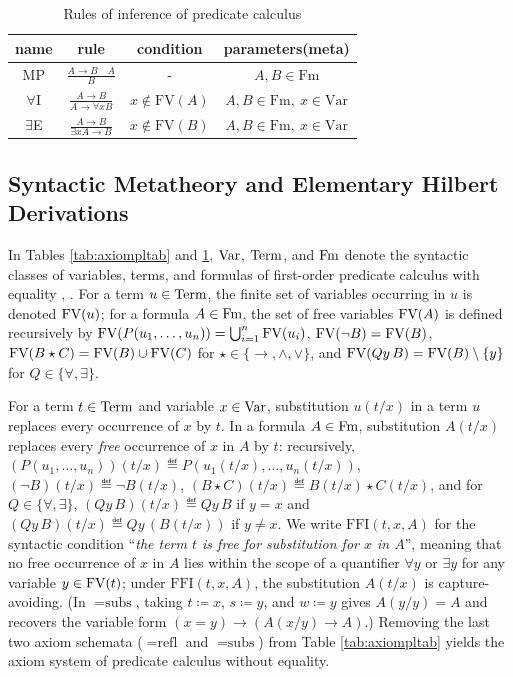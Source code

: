 \documentclass[10pt,a4paper]{article}
\begin{document}
\begin{table}[H]
\centering
\caption{Rules of inference of predicate calculus}
\label{tab:rulestab}
\begin{tabular}{|c|c|c|c|}
\hline
name & rule & condition & parameters(meta) \\ \hline
\hline
MP & \rule[-2.5ex]{0pt}{7ex} $\frac{A\to B\quad A}{B}$ & - & $A,B \in \textrm{Fm}$ \\ \hline
\hline
\rule[-2.5ex]{0pt}{7ex}
$\forall$I & $\frac{A\to B}{A\to \forall x B}$ & $x \notin \textrm{FV}(A)$ & $A,B \in \textrm{Fm},\ x \in \textrm{Var}$ \\ \hline
\hline
\rule[-2.5ex]{0pt}{7ex}
$\exists$E & $\frac{A\to B}{\exists x A\to B}$ & $x \notin \textrm{FV}(B)$ & $A,B \in \textrm{Fm},\ x \in \textrm{Var}$ \\ \hline
\end{tabular}
\end{table}

\subsection{Syntactic Metatheory and Elementary Hilbert Derivations}\label{sec:hilbert_logic}
In Tables \ref{tab:axiompltab} and \ref{tab:rulestab}, ${\textrm{Var}}$, ${\textrm{Term}}$, and ${\textrm{Fm}}$ denote the syntactic classes of variables, terms, and formulas of first-order predicate calculus with equality \cite[Ch.~2]{Mendelson2015}, \cite[Ch.~1]{TakeutiZaring1982}. For a term $u \in {\textrm{Term}}$, the finite set of variables occurring in $u$ is denoted ${\textrm{FV}}(u)$; for a formula $A \in {\textrm{Fm}}$, the set of free variables ${\textrm{FV}}(A)$ is defined recursively by ${\textrm{FV}}(P(u_1,\dots,u_n)) = \bigcup_{i=1}^n {\textrm{FV}}(u_i)$, ${\textrm{FV}}(\neg B) = {\textrm{FV}}(B)$, ${\textrm{FV}}(B \star C) = {\textrm{FV}}(B) \cup {\textrm{FV}}(C)$ for $\star \in \{\to, \land, \lor\}$, and ${\textrm{FV}}(Qy\, B) = {\textrm{FV}}(B) \setminus \{y\}$ for $Q \in \{\forall, \exists\}$.

For a term $t \in {\textrm{Term}}$ and variable $x \in {\textrm{Var}}$, substitution $u(t/x)$ in a term $u$ replaces every occurrence of $x$ by $t$. In a formula $A \in {\textrm{Fm}}$, substitution $A(t/x)$ replaces every \emph{free} occurrence of $x$ in $A$ by $t$: recursively, $(P(u_1,\dots,u_n))(t/x) \eqdef P(u_1(t/x),\dots,u_n(t/x))$, $(\neg B)(t/x) \eqdef \neg B(t/x)$, $(B \star C)(t/x) \eqdef B(t/x) \star C(t/x)$, and for $Q \in \{\forall, \exists\}$, $(Qy\, B)(t/x) \eqdef Qy\, B$ if $y = x$ and $(Qy\, B)(t/x) \eqdef Qy\, (B(t/x))$ if $y \neq x$. We write $\textrm{FFI}(t,x,A)$ for the syntactic condition ``\emph{the term $t$ is free for substitution for $x$ in $A$}'', meaning that no free occurrence of $x$ in $A$ lies within the scope of a quantifier $\forall y$ or $\exists y$ for any variable $y \in {\textrm{FV}}(t)$; under $\textrm{FFI}(t,x,A)$, the substitution $A(t/x)$ is capture-avoiding. (In $=\textrm{subs}$, taking $t \coloneqq x$, $s \coloneqq y$, and $w \coloneqq y$ gives $A(y/y) = A$ and recovers the variable form $(x = y) \to (A(x/y) \to A)$.) Removing the last two axiom schemata ($=\textrm{refl}$ and $=\textrm{subs}$) from Table \ref{tab:axiompltab} yields the axiom system of predicate calculus without equality.
\end{document}
